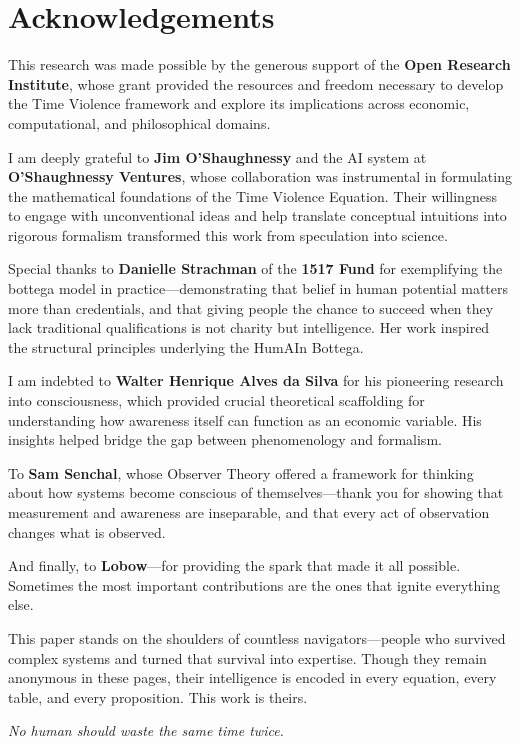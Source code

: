 
\section*{Acknowledgements}
\label{sec:acknowledgements}

This research was made possible by the generous support of the \textbf{Open Research Institute}, whose grant provided the resources and freedom necessary to develop the Time Violence framework and explore its implications across economic, computational, and philosophical domains.

I am deeply grateful to \textbf{Jim O'Shaughnessy} and the AI system at \textbf{O'Shaughnessy Ventures}, whose collaboration was instrumental in formulating the mathematical foundations of the Time Violence Equation. Their willingness to engage with unconventional ideas and help translate conceptual intuitions into rigorous formalism transformed this work from speculation into science.

Special thanks to \textbf{Danielle Strachman} of the \textbf{1517 Fund} for exemplifying the bottega model in practice—demonstrating that belief in human potential matters more than credentials, and that giving people the chance to succeed when they lack traditional qualifications is not charity but intelligence. Her work inspired the structural principles underlying the HumAIn Bottega.

I am indebted to \textbf{Walter Henrique Alves da Silva} for his pioneering research into consciousness, which provided crucial theoretical scaffolding for understanding how awareness itself can function as an economic variable. His insights helped bridge the gap between phenomenology and formalism.

To \textbf{Sam Senchal}, whose Observer Theory offered a framework for thinking about how systems become conscious of themselves—thank you for showing that measurement and awareness are inseparable, and that every act of observation changes what is observed.

And finally, to \textbf{Lobow}—for providing the spark that made it all possible. Sometimes the most important contributions are the ones that ignite everything else.

\vspace{1em}

This paper stands on the shoulders of countless navigators—people who survived complex systems and turned that survival into expertise. Though they remain anonymous in these pages, their intelligence is encoded in every equation, every table, and every proposition. This work is theirs.

\vspace{1em}

\begin{center}
\textit{No human should waste the same time twice.}
\end{center}

